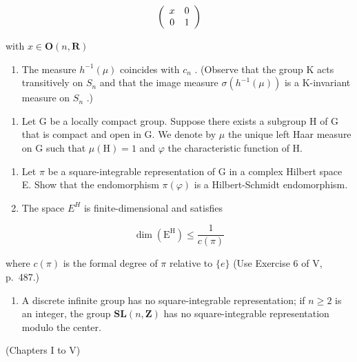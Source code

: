 \[
\left( \begin{array}{c c} x & 0 \\ 0 & 1 \end{array} \right)
\]

with \(x\in \mathbf{O}(n,\mathbf{R})\)

\begin{enumerate}
\def\labelenumi{\alph{enumi})}
\setcounter{enumi}{7}
\tightlist
\item
  The measure \(h^{-1}(\mu)\) coincides with \(c_{n}\) . (Observe that the group K acts transitively on \(S_{n}\) and that the image measure \(\sigma(h^{-1}(\mu))\) is a K-invariant measure on \(S_{n}\) .)
\end{enumerate}

\begin{enumerate}
\def\labelenumi{\arabic{enumi})}
\setcounter{enumi}{31}
\tightlist
\item
  Let G be a locally compact group. Suppose there exists a subgroup H of G that is compact and open in G. We denote by \(\mu\) the unique left Haar measure on G such that \(\mu(\mathrm{H}) = 1\) and \(\varphi\) the characteristic function of H.
\end{enumerate}

\begin{enumerate}
\def\labelenumi{\alph{enumi})}
\item
  Let \(\pi\) be a square-integrable representation of G in a complex Hilbert space E. Show that the endomorphism \(\pi(\varphi)\) is a Hilbert-Schmidt endomorphism.
\item
  The space \(E^{H}\) is finite-dimensional and satisfies
\end{enumerate}

\[
\dim (\mathrm{E} ^ {\mathrm{H}}) \leqslant \frac {1}{c (\pi)}
\]

where \(c(\pi)\) is the formal degree of \(\pi\) relative to \(\{e\}\) (Use Exercise 6 of V, p.~487.)

\begin{enumerate}
\def\labelenumi{\alph{enumi})}
\setcounter{enumi}{2}
\tightlist
\item
  A discrete infinite group has no square-integrable representation; if \(n \geqslant 2\) is an integer, the group \(\mathbf{SL}(n, \mathbf{Z})\) has no square-integrable representation modulo the center.
\end{enumerate}


(Chapters I to V)

